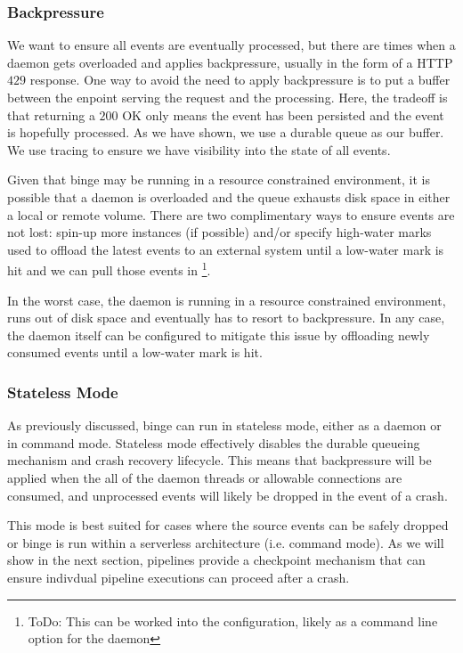 \documentclass[10pt,twocolumn]{article}
\begin{document}
\subsubsection{Backpressure}

We want to ensure all events are eventually processed, but there are times when
a daemon gets overloaded and applies backpressure, usually in the form of a
HTTP $429$ response.  One way to avoid the need to apply backpressure is to put
a buffer between the enpoint serving the request and the processing.  Here, the
tradeoff is that returning a $200$ OK only means the event has been persisted
and the event is hopefully processed.  As we have shown, we use a durable queue
as our buffer.  We use tracing to ensure we have visibility into the state of
all events.  

Given that binge may be running in a resource constrained environment, it is
possible that a daemon is overloaded and the queue exhausts disk space in
either a local or remote volume.  There are two complimentary ways to ensure
events are not lost: spin-up more instances (if possible) and/or specify
high-water marks used to offload the latest events to an external system until
a low-water mark is hit and we can pull those events in \footnote{ToDo: This
can be worked into the configuration, likely as a command line option for the
daemon}.

In the worst case, the daemon is running in a resource constrained environment,
runs out of disk space and eventually has to resort to backpressure.  In any
case, the daemon itself can be configured to mitigate this issue by offloading
newly consumed events until a low-water mark is hit.

\subsubsection{Stateless Mode}

As previously discussed, binge can run in stateless mode, either as a daemon or
in command mode.  Stateless mode effectively disables the durable queueing
mechanism and crash recovery lifecycle.  This means that backpressure will be
applied when the all of the daemon threads or allowable connections are
consumed, and unprocessed events will likely be dropped in the event of a
crash.  

This mode is best suited for cases where the source events can be safely
dropped or binge is run within a serverless architecture (i.e. command
mode).  As we will show in the next section, pipelines provide a checkpoint
mechanism that can ensure indivdual pipeline executions can proceed after a
crash.
\end{document}
